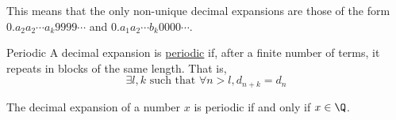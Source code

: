 \documentclass[../Main.tex]{subfiles}
\begin{document}
\begin{remark}
    This means that the only non-unique decimal expansions are those of the form $0.a_2 a_2 \cdots a_k 9999\cdots$ and $0.a_1 a_2 \cdots b_k 0000 \cdots$.
\end{remark}
\begin{definition}{Periodic}
    A decimal expansion is \underline{periodic} if, after a finite number of terms, it repeats in blocks of the same length. That is,
    \begin{equation}
        \exists l, k \text{ such that } \forall n > l, d_{n+k} = d_n
        \label{eqnPeriodicExpansion}
    \end{equation}
\end{definition}
\begin{proposition}
    The decimal expansion of a number $x$ is periodic if and only if $x \in \Q$.
    \label{propDecimalExpansionPeriodic}
\end{proposition}
\end{document}
